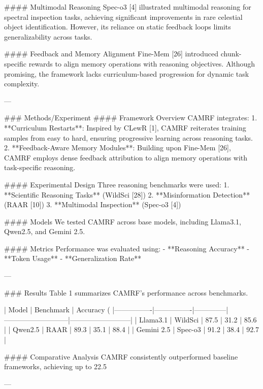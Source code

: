 #### Multimodal Reasoning  
Spec-o3 [4] illustrated multimodal reasoning for spectral inspection tasks, achieving significant improvements in rare celestial object identification. However, its reliance on static feedback loops limits generalizability across tasks.  

#### Feedback and Memory Alignment  
Fine-Mem [26] introduced chunk-specific rewards to align memory operations with reasoning objectives. Although promising, the framework lacks curriculum-based progression for dynamic task complexity.  

---

### Methods/Experiment  
#### Framework Overview  
CAMRF integrates:  
1. **Curriculum Restarts**: Inspired by CLewR [1], CAMRF reiterates training samples from easy to hard, ensuring progressive learning across reasoning tasks.  
2. **Feedback-Aware Memory Modules**: Building upon Fine-Mem [26], CAMRF employs dense feedback attribution to align memory operations with task-specific reasoning.  

#### Experimental Design  
Three reasoning benchmarks were used:  
1. **Scientific Reasoning Tasks** (WildSci [28])  
2. **Misinformation Detection** (RAAR [10])  
3. **Multimodal Inspection** (Spec-o3 [4])  

#### Models  
We tested CAMRF across base models, including Llama3.1, Qwen2.5, and Gemini 2.5.  

#### Metrics  
Performance was evaluated using:  
- **Reasoning Accuracy**  
- **Token Usage**  
- **Generalization Rate**  

---

### Results  
Table 1 summarizes CAMRF's performance across benchmarks.  

| Model          | Benchmark      | Accuracy (%
|----------------|----------------|--------------|---------------------------|--------------------------|  
| Llama3.1       | WildSci        | 87.5         | 31.2                      | 85.6                    |  
| Qwen2.5        | RAAR           | 89.3         | 35.1                      | 88.4                    |  
| Gemini 2.5     | Spec-o3        | 91.2         | 38.4                      | 92.7                    |  

#### Comparative Analysis  
CAMRF consistently outperformed baseline frameworks, achieving up to 22.5%

---

